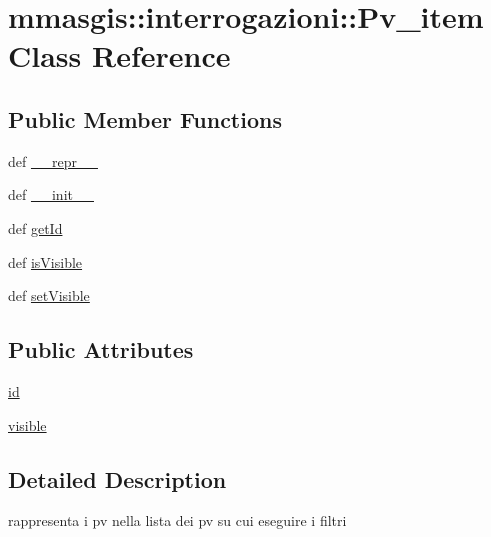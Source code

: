 \hypertarget{classmmasgis_1_1interrogazioni_1_1Pv__item}{
\section{mmasgis::interrogazioni::Pv\_\-item Class Reference}
\label{classmmasgis_1_1interrogazioni_1_1Pv__item}
}
\subsection*{Public Member Functions}
\begin{DoxyCompactItemize}
\item 
def \hyperlink{classmmasgis_1_1interrogazioni_1_1Pv__item_aa876ac82db0956afdbb64a8c09d5150f}{\_\-\_\-repr\_\-\_\-}
\item 
def \hyperlink{classmmasgis_1_1interrogazioni_1_1Pv__item_ae62214943ae7d9942ad64af5d434c698}{\_\-\_\-init\_\-\_\-}
\item 
def \hyperlink{classmmasgis_1_1interrogazioni_1_1Pv__item_ad019877edb80c2bca4264709009775e9}{getId}
\item 
def \hyperlink{classmmasgis_1_1interrogazioni_1_1Pv__item_a57456f7f0f830e9ccce18d81b1311bb0}{isVisible}
\item 
def \hyperlink{classmmasgis_1_1interrogazioni_1_1Pv__item_a607bf565e6e20fbcb8af2ac348493d98}{setVisible}
\end{DoxyCompactItemize}
\subsection*{Public Attributes}
\begin{DoxyCompactItemize}
\item 
\hyperlink{classmmasgis_1_1interrogazioni_1_1Pv__item_aeec8364817c6956835f3b743a4bb8f86}{id}
\item 
\hyperlink{classmmasgis_1_1interrogazioni_1_1Pv__item_a5f1a111c8a0ccaab5b220bde2267ca69}{visible}
\end{DoxyCompactItemize}


\subsection{Detailed Description}
\begin{DoxyVerb}
rappresenta i pv nella lista dei pv  su cui eseguire i filtri
\end{DoxyVerb}
 

